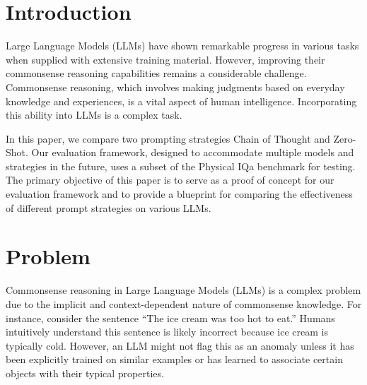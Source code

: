 \documentclass[fleqn,moreauthors,10pt]{ds_report}
\affiliation{\textit{Advisors: Aleš Žagar}}
\begin{document}
\flushbottom 

\maketitle 

\thispagestyle{empty} 


\section*{Introduction}
Large Language Models (LLMs) have shown remarkable progress in various tasks when supplied with extensive training material. However, improving their commonsense reasoning capabilities remains a considerable challenge. Commonsense reasoning, which involves making judgments based on everyday knowledge and experiences, is a vital aspect of human intelligence. Incorporating this ability into LLMs is a complex task.

In this paper, we compare two prompting strategies Chain of Thought and Zero-Shot. Our evaluation framework, designed to accommodate multiple models and strategies in the future, uses a subset of the Physical IQa benchmark for testing. The primary objective of this paper is to serve as a proof of concept for our evaluation framework and to provide a blueprint for comparing the effectiveness of different prompt strategies on various LLMs.

\section*{Problem}

Commonsense reasoning in Large Language Models (LLMs) is a complex problem due to the implicit and context-dependent nature of commonsense knowledge. For instance, consider the sentence “The ice cream was too hot to eat.” Humans intuitively understand this sentence is likely incorrect because ice cream is typically cold. However, an LLM might not flag this as an anomaly unless it has been explicitly trained on similar examples or has learned to associate certain objects with their typical properties.
\end{document}
